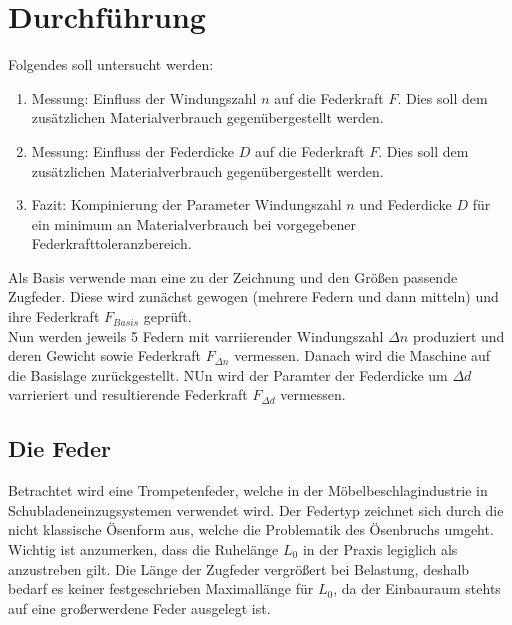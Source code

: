 \section{Durchführung}
\label{sec:Durchfuehrung}
Folgendes soll untersucht werden:
\begin{enumerate}
    \item Messung: Einfluss der Windungszahl $n$ auf die Federkraft $F$. Dies soll dem zusätzlichen
    Materialverbrauch gegenübergestellt werden.
    \item Messung: Einfluss der Federdicke $D$ auf die Federkraft $F$. Dies soll dem zusätzlichen
    Materialverbrauch gegenübergestellt werden.
    \item Fazit: Kompinierung der Parameter Windungszahl $n$ und Federdicke $D$ für ein minimum
    an Materialverbrauch bei vorgegebener Federkrafttoleranzbereich.
\end{enumerate}
Als Basis verwende man eine zu der Zeichnung und den Größen passende Zugfeder. Diese
wird zunächst gewogen (mehrere Federn und dann mitteln) und ihre Federkraft $F_{Basis}$
geprüft.\\
Nun werden jeweils 5 Federn mit varriierender Windungszahl $\Delta n$ produziert und deren
Gewicht sowie Federkraft $F_{\Delta n}$ vermessen.
Danach wird die Maschine auf die Basislage zurückgestellt. NUn wird der Paramter 
der Federdicke um $\Delta d$ varrieriert und resultierende Federkraft $F_{\Delta d}$
vermessen.  


\subsection{Die Feder}
Betrachtet wird eine Trompetenfeder, welche in der Möbelbeschlagindustrie in Schubladeneinzugsystemen
verwendet wird. 
Der Federtyp zeichnet sich durch die nicht klassische Ösenform aus, welche die Problematik des Ösenbruchs umgeht.\\

Wichtig ist anzumerken, dass die Ruhelänge $L_0$ in der Praxis legiglich als anzustreben gilt.
Die Länge der Zugfeder vergrößert bei Belastung, deshalb bedarf es keiner festgeschrieben Maximallänge für $L_0$, da
der Einbauraum stehts auf eine großerwerdene Feder ausgelegt ist.  
\newline


